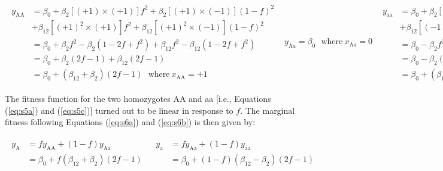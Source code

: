 \documentclass[12pt,]{article}
\begin{document}
\begin{subequations}
\begin{gather}
    \begin{split}
y_\mathrm{AA} &= \beta_0 + \beta_2 [(+1)\times(+1)] f^2 + \beta_2 [(+1)\times(-1)] (1-f)^2 \\
& + \beta_{12} [(+1)^2\times(+1)] f^2 + \beta_{12} [(+1)^2\times(-1)] (1-f)^2 \\ 
&= \beta_0 + \beta_2f^2 - \beta_2(1-2f+f^2) + \beta_{12}f^2 - \beta_{12}(1-2f+f^2) \\
&= \beta_0 + \beta_2(2f - 1) + \beta_{12}(2f-1) \\ 
&= \beta_0 + (\beta_{12}+\beta_2)(2f-1)~~~\mathrm{where}~x_\mathrm{AA} = +1 \label{eq:s11a}
    \end{split}
\end{gather}
\begin{gather}
    y_\mathrm{Aa} = \beta_0~~~\mathrm{where}~x_\mathrm{Aa} = 0 \label{eq:s11b}
\end{gather}
\begin{gather}
    \begin{split}
y_\mathrm{aa} &= \beta_0 + \beta_2 [(-1)\times(+1)] f^2\ + \beta_2 [(-1)\times(+1)] (1-f)^2 \\
& + \beta_{12} [(-1)^2\times(+1)] f^2 + \beta_{12} [(-1)^2\times(-1)] (1-f)^2 \\
&= \beta_0 - \beta_2f^2 + \beta_2(1-2f+f^2) + \beta_{12}f^2 - \beta_{12}(1-2f+f^2) \\
&= \beta_0 - \beta_2(2f - 1) + \beta_{12}(2f-1) \\
&= \beta_0 + (\beta_{12} - \beta_2)(2f - 1)~~~\mathrm{where}~x_\mathrm{aa} = -1 \label{eq:s11c}
    \end{split}
\end{gather}
\end{subequations}

\noindent
The fitness function for the two homozygotes AA and aa [i.e., Equations (\ref{eq:s5a}) and (\ref{eq:s5c})] turned out to be linear in response to $f$. The marginal fitness following Equations (\ref{eq:s6a}) and (\ref{eq:s6b}) is then given by:

\begin{subequations}
\begin{gather}
    \begin{split}
y_\mathrm{A} &= fy_\mathrm{AA} + (1-f)y_\mathrm{Aa}\\
&= \beta_0+f(\beta_{12}+\beta_2)(2f-1) \label{eq:s12a}
    \end{split}
\end{gather}
\begin{gather}
    \begin{split}
y_\mathrm{a} &= fy_\mathrm{Aa} + (1-f)y_\mathrm{aa}\\
&= \beta_0+(1-f)(\beta_{12}-\beta_2)(2f-1) \label{eq:s12b}
    \end{split}
\end{gather}
\end{subequations}
\end{document}
